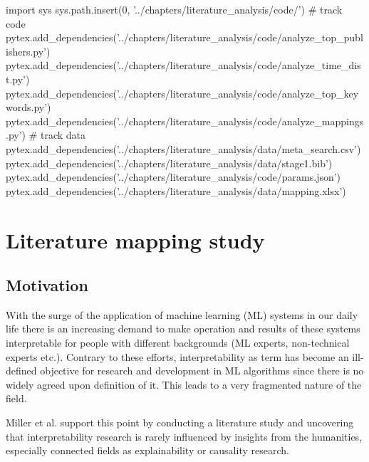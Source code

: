 % 
\begin{pycode}
import sys
sys.path.insert(0, '../chapters/literature_analysis/code/')
# track code
pytex.add_dependencies('../chapters/literature_analysis/code/analyze_top_publishers.py')
pytex.add_dependencies('../chapters/literature_analysis/code/analyze_time_dist.py')
pytex.add_dependencies('../chapters/literature_analysis/code/analyze_top_keywords.py')
pytex.add_dependencies('../chapters/literature_analysis/code/analyze_mappings.py')
# track data
pytex.add_dependencies('../chapters/literature_analysis/data/meta_search.csv')
pytex.add_dependencies('../chapters/literature_analysis/data/stage1.bib')
pytex.add_dependencies('../chapters/literature_analysis/code/params.json')
pytex.add_dependencies('../chapters/literature_analysis/data/mapping.xlsx')
\end{pycode}

\chapter{Literature mapping study}

\section{Motivation}

With the surge of the application of machine learning (ML) systems in our daily life there is an increasing demand to make operation and results of these systems interpretable for people with different backgrounds (ML experts, non-technical experts etc.). Contrary to these efforts, interpretability as term has become an ill-defined objective \cite{liptonMythosModelInterpretability2016a} for research and development in ML algorithms since there is no widely agreed upon definition of it. This leads to a very fragmented nature of the field. 

Miller et al. \cite{millerExplainableAIBeware2017} support this point by conducting a literature study and uncovering that interpretability research is rarely influenced by insights from the humanities, especially connected fields as explainability or causality research.

